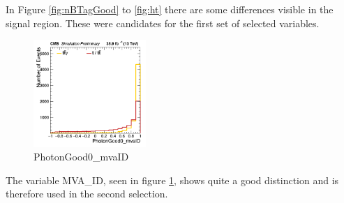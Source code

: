 \documentclass[11pt]{scrartcl}
\begin{document}
In Figure \ref{fig:nBTagGood} to \ref{fig:ht} there are some differences visible in the signal region. These were candidates for the first set of selected variables. 

	\begin{figure}[H]
	\centering
	\includegraphics[width=0.38\textwidth]{figures/Select2/PhotonGood0_mvaID.png}
	\caption{PhotonGood0\_mvaID}
 	\label{fig:PhotonGood0mvaID}
	\end{figure}
	
The variable MVA\_ID, seen in figure \ref{fig:PhotonGood0mvaID}, shows quite a good distinction and is therefore used in the second selection.
\end{document}
